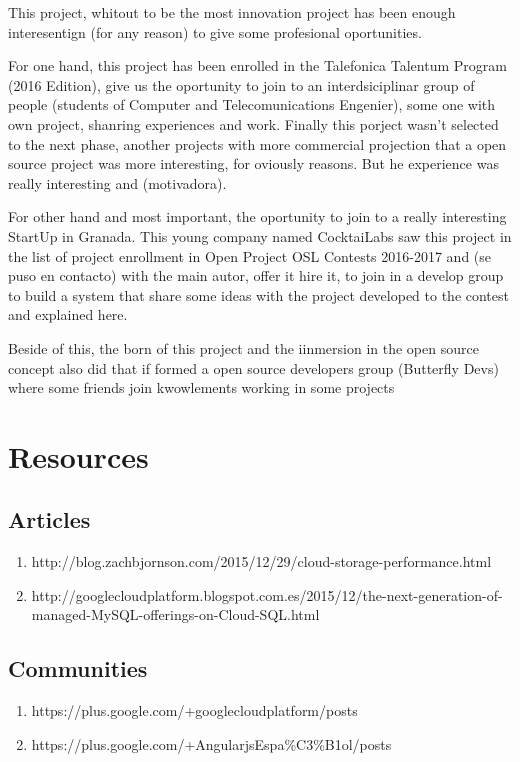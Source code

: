 \documentclass[oneside,english,titlepage]{scrbook}
\begin{document}
This project, whitout to be the most innovation project has been enough interesentign (for any reason) to give some profesional oportunities. 

For one hand, this project has been enrolled in the Talefonica Talentum Program (2016 Edition), give us the oportunity to join to an interdsiciplinar group of people (students of Computer and Telecomunications Engenier), some one with own project, shanring experiences and work. Finally this porject wasn't selected to the next phase, another projects with more commercial projection that a open source project was more interesting, for oviously reasons. But he experience was really interesting and (motivadora). 

For other hand and most important, the oportunity to join to a really interesting StartUp in Granada. This young company named CocktaiLabs saw this project in the list of project enrollment in Open Project OSL Contests 2016-2017 and (se puso en contacto) with the main autor, offer it hire it, to join in a develop group to build a system that share some ideas with the project developed to the contest and explained here.

Beside of this, the born of this project and the iinmersion in the open source concept also did that if formed a open source developers group (Butterfly Devs) where some friends join kwowlements working in some projects 


\chapter{Resources }

\section{Articles}
\begin{enumerate}
\item http://blog.zachbjornson.com/2015/12/29/cloud-storage-performance.html
\item http://googlecloudplatform.blogspot.com.es/2015/12/the-next-generation-of-managed-MySQL-offerings-on-Cloud-SQL.html
\end{enumerate}

\section{Communities}
\begin{enumerate}
\item https://plus.google.com/+googlecloudplatform/posts
\item https://plus.google.com/+AngularjsEspa\%C3\%B1ol/posts
\end{enumerate}
\end{document}
